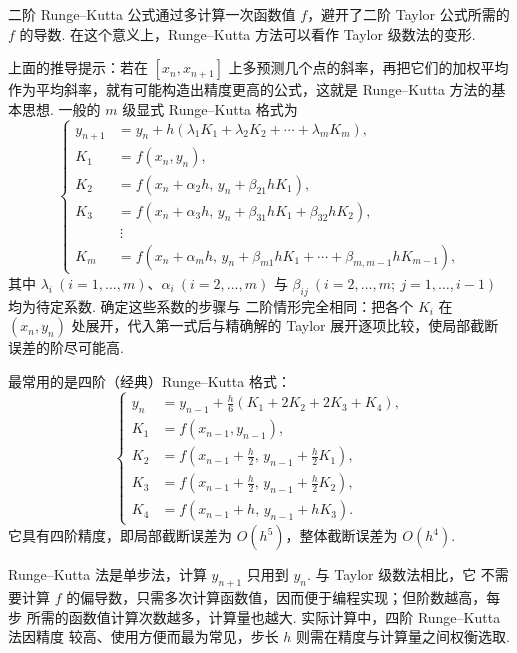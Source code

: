 \begin{rmk}
二阶 Runge--Kutta 公式通过多计算一次函数值 $f$，避开了二阶 Taylor 公式所需的
$f$ 的导数. 在这个意义上，Runge--Kutta 方法可以看作 Taylor 级数法的变形.
\end{rmk}

上面的推导提示：若在 $[x_n,x_{n+1}]$ 上多预测几个点的斜率，再把它们的加权平均
作为平均斜率，就有可能构造出精度更高的公式，这就是 Runge--Kutta 方法的基本思想.
一般的 $m$ 级显式 Runge--Kutta 格式为
\begin{equation}\label{equ:2.59}
\left\{
\begin{aligned}
y_{n+1}&=y_n+h(\lambda_1K_1+\lambda_2K_2+\cdots+\lambda_mK_m),\\
K_1&=f(x_n,y_n),\\
K_2&=f(x_n+\alpha_2h,\,y_n+\beta_{21}hK_1),\\
K_3&=f(x_n+\alpha_3h,\,y_n+\beta_{31}hK_1+\beta_{32}hK_2),\\
&\ \vdots\\
K_m&=f(x_n+\alpha_mh,\,
y_n+\beta_{m1}hK_1+\cdots+\beta_{m,m-1}hK_{m-1}),
\end{aligned}
\right.
\end{equation}
其中 $\lambda_i\ (i=1,\ldots,m)$、$\alpha_i\ (i=2,\ldots,m)$ 与
$\beta_{ij}\ (i=2,\ldots,m;\ j=1,\ldots,i-1)$ 均为待定系数. 确定这些系数的步骤与
二阶情形完全相同：把各个 $K_i$ 在 $(x_n,y_n)$ 处展开，代入第一式后与精确解的
Taylor 展开逐项比较，使局部截断误差的阶尽可能高.

最常用的是四阶（经典）Runge--Kutta 格式：
\begin{equation}\label{equ:2.60}
\left\{
\begin{aligned}
y_n&=y_{n-1}+\frac{h}{6}(K_1+2K_2+2K_3+K_4),\\
K_1&=f(x_{n-1},y_{n-1}),\\
K_2&=f\left(x_{n-1}+\frac{h}{2},\,y_{n-1}+\frac{h}{2}K_1\right),\\
K_3&=f\left(x_{n-1}+\frac{h}{2},\,y_{n-1}+\frac{h}{2}K_2\right),\\
K_4&=f(x_{n-1}+h,\,y_{n-1}+hK_3).
\end{aligned}
\right.
\end{equation}
它具有四阶精度，即局部截断误差为 $O(h^5)$，整体截断误差为 $O(h^4)$.

\begin{rmk}
Runge--Kutta 法是单步法，计算 $y_{n+1}$ 只用到 $y_n$. 与 Taylor 级数法相比，它
不需要计算 $f$ 的偏导数，只需多次计算函数值，因而便于编程实现；但阶数越高，每步
所需的函数值计算次数越多，计算量也越大. 实际计算中，四阶 Runge--Kutta 法因精度
较高、使用方便而最为常见，步长 $h$ 则需在精度与计算量之间权衡选取.
\end{rmk}

